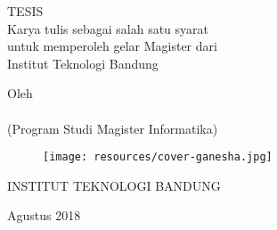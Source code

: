 \clearpage
\pagestyle{empty}

\begin{center}
\smallskip

    \singlespacing
    \large \bfseries \MakeUppercase{\thetitle}
    \vfill

    \large TESIS \\
    \bigskip
    \normalsize Karya tulis sebagai salah satu syarat\\
    untuk memperoleh gelar Magister dari\\
    Institut Teknologi Bandung
    \vfill

    \normalsize Oleh\\
    \large \theauthor\\
    (Program Studi Magister Informatika)


    \vfill
    \begin{figure}[h]
        \centering
      	\texttt{[image: resources/cover-ganesha.jpg]}
    \end{figure}
    \vfill

    \large
    \uppercase{
        Institut Teknologi Bandung
    }

    Agustus 2018

\end{center}

\clearpage
